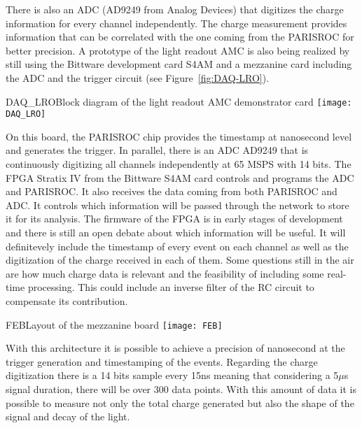 There is also an ADC (AD9249 from Analog Devices) that digitizes the charge information for every channel independently. The charge measurement provides information that can be correlated with the one coming from the PARISROC for better precision. A prototype of the light readout AMC is also being realized by still using the Bittware development card S4AM and a mezzanine card including the ADC and the trigger circuit (see Figure~\ref{fig:DAQ-LRO}). 


\begin{cdrfigure}{DAQ_LRO}{Block diagram of the light readout AMC demonstrator card}
 \texttt{[image: DAQ\_LRO]}  
\end{cdrfigure}

On this board, the PARISROC chip provides the timestamp at nanosecond level and generates the trigger. In parallel, there is an ADC AD9249 that is continuously digitizing all channels independently at 65 MSPS with 14 bits. The FPGA Stratix IV from the Bittware S4AM card controls and programs the ADC and PARISROC. It also receives the data coming from both PARISROC and ADC. It controls which information will be passed through the network to store it for its analysis. The firmware of the FPGA is in early stages of development and there is still an open debate about which information will be useful. It will definitevely include the timestamp of every event on each channel as well as the digitization of the charge received in each of them. Some questions still in the air are how much charge data is relevant and the feasibility of including some real-time processing. This could include an inverse filter of the RC circuit to compensate its contribution. 

\begin{cdrfigure}{FEB}{Layout of the mezzanine board}
 \texttt{[image: FEB]}  
\end{cdrfigure}
 
With this architecture it is possible to achieve a precision of nanosecond at the trigger generation and timestamping of the events. Regarding the charge digitization there is a 14 bits sample every 15ns meaning that considering a 5$\mu$s signal duration, there will be over 300 data points. With this amount of data it is possible to measure not only the total charge generated but also the shape of the signal and decay of the light.
